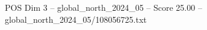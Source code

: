 \begin{textsample}{POS Dim 3 – global\_north\_2024\_05 – Score 25.00 – global\_north\_2024\_05/108056725.txt}
\end{textsample}
